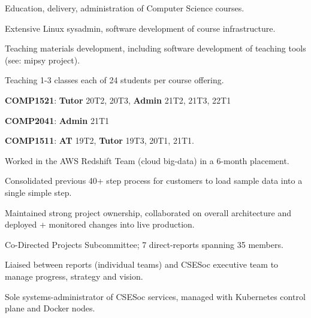 \documentclass[a4paper]{deedy-resume}
\begin{document}
\begin{minipage}[t]{0.63\textwidth}
\begin{tightitemize}
\item Education, delivery, administration of Computer Science courses.
\item Extensive Linux sysadmin,
	  software development of course infrastructure.
\item Teaching materials development, including software
	  development of teaching tools (see: mipsy project).
\item Teaching 1-3 classes each of 24 students per course offering.
\item \textbf{COMP1521}: \textbf{Tutor} 20T2, 20T3,
						 \textbf{Admin} 21T2, 21T3, 22T1
\item \textbf{COMP2041}: \textbf{Admin} 21T1
\item \textbf{COMP1511}: \textbf{AT}    19T2,
						 \textbf{Tutor} 19T3, 20T1, 21T1.
\end{tightitemize}

\sectionspace



\begin{tightitemize}
\item Worked in the AWS Redshift Team (cloud big-data)
	  in a 6-month placement.
\item Consolidated previous 40+ step process for customers
	  to load sample data into a single simple step.
\item Maintained strong project ownership, collaborated
	  on overall architecture and deployed + monitored changes
	  into live production.
\end{tightitemize}

\sectionspace



\begin{tightitemize}
\item Co-Directed Projects Subcommittee;
	  7 direct-reports spanning 35 members.
\item Liaised between reports (individual teams) and
	  CSESoc executive team to manage progress,
	  strategy and vision.
\item Sole systems-administrator of CSESoc services,
	  managed with Kubernetes control plane and
	  Docker nodes.
\end{tightitemize}


\end{minipage}
\end{document}
